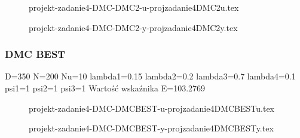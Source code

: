 \ifdefined\CompileFigures
    \begin{figure}[H] 
        \centering
        
        \caption{projekt-zadanie4-DMC-DMC2-u-projzadanie4DMC2u.tex}
        \label{projekt:zad4:figure:projzadanie4DMC2u}
\end{figure}
\fi

\ifdefined\CompileFigures
    \begin{figure}[H] 
        \centering
        
        \caption{projekt-zadanie4-DMC-DMC2-y-projzadanie4DMC2y.tex}
        \label{projekt:zad4:figure:projzadanie4DMC2y}
    \end{figure}
\fi

\subsubsection{DMC BEST}
D=350 N=200 Nu=10 lambda1=0.15 lambda2=0.2 lambda3=0.7 lambda4=0.1
psi1=1 psi2=1 psi3=1 Wartość wskaźnika E=103.2769


\ifdefined\CompileFigures
    \begin{figure}[H] 
        \centering
        
        \caption{projekt-zadanie4-DMC-DMCBEST-u-projzadanie4DMCBESTu.tex}
        \label{projekt:zad4:figure:projzadanie4DMCBESTu}
    \end{figure}
\fi




\ifdefined\CompileFigures
    \begin{figure}[H] 
        \centering
        
        \caption{projekt-zadanie4-DMC-DMCBEST-y-projzadanie4DMCBESTy.tex}
        \label{projekt:zad4:figure:projzadanie4DMCBESTy}
    \end{figure}
\fi


\newpage
